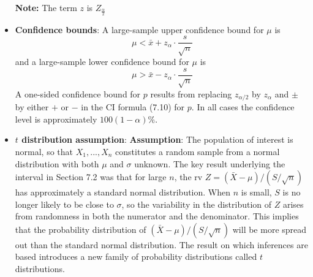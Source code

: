 \documentclass{report}
\begin{document}
\begin{itemize}
            \bigbreak \noindent 
            \textbf{Note:} The term $z$ is $Z_{\frac{\alpha}{2}} $
        \item \textbf{Confidence bounds}:
            A large-sample upper confidence bound for $\mu$ is
            \[
                \mu < \bar{x} + z_{\alpha} \cdot \frac{s}{\sqrt{n}}
            \]
            and a large-sample lower confidence bound for $\mu$ is
            \[
                \mu > \bar{x} - z_{\alpha} \cdot \frac{s}{\sqrt{n}}
            \]
            A one-sided confidence bound for $p$ results from replacing $z_{\alpha/2}$ by $z_{\alpha}$ and $\pm$ by either $+$ or $-$ in the CI formula (7.10) for $p$. In all cases the confidence level is approximately $100(1 - \alpha)\%$.
        \item \textbf{$t$ distribution assumption}:
            \bigbreak \noindent 
            \textbf{Assumption}: The population of interest is normal, so that $X_{1}, ..., X_{n}$ constitutes a random sample from a normal distribution with both $\mu$ and $\sigma$ unknown.
            \bigbreak \noindent 
            The key result underlying the interval in Section 7.2 was that for large $n$, the rv $Z = (\bar{X} - \mu)/(S/\sqrt{n})$ has approximately a standard normal distribution. When $n$ is small, $S$ is no longer likely to be close to $\sigma$, so the variability in the distribution of $Z$ arises from randomness in both the numerator and the denominator. This implies that the probability distribution of $(\bar{X} - \mu)/(S/\sqrt{n})$ will be more spread out than the standard normal distribution. The result on which inferences are based introduces a new family of probability distributions called $t$ distributions.
            \bigbreak \noindent 


\end{itemize}
\end{document}

